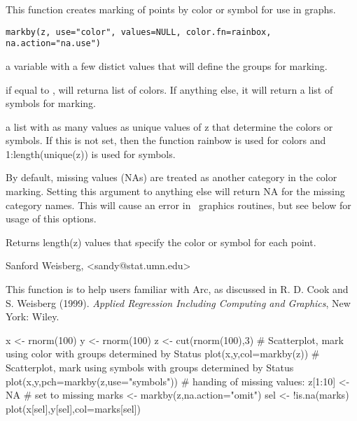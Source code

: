 \begin{Description}\relax
This function creates marking of points by color or symbol for use in graphs.\end{Description}
\begin{Usage}
\begin{verbatim}
markby(z, use="color", values=NULL, color.fn=rainbox, na.action="na.use")
\end{verbatim}
\end{Usage}
\begin{Arguments}
\begin{ldescription}
\item[\code{z}] a variable with a few distict values that will define the groups for
marking.
\item[\code{use}] if equal to , will returna list of colors.  If
anything else, it will return a list of symbols for marking.
\item[\code{values}] a list with as many values as unique values of z that determine
the colors or symbols.  If this is not set, then the function rainbow is used
for colors and 1:length(unique(z)) is used for symbols.
\item[\code{color.fn}] 
\item[\code{na.action}] 
\end{ldescription}
 By default, missing values (NAs) are treated as another
category in the color marking.  Setting this argument to anything else will
return NA for the missing category names.  This will cause an error in \R\
graphics routines, but see below for usage of this options.\end{Arguments}
\begin{Value}
Returns length(z) values that specify the color or symbol for each point.\end{Value}
\begin{Author}\relax
Sanford Weisberg, <sandy@stat.umn.edu>\end{Author}
\begin{References}\relax
This function is to help users familiar with Arc, as discussed in
R. D. Cook and S. Weisberg (1999).  \emph{Applied Regression Including
Computing and Graphics}, New York:  Wiley.\end{References}
\begin{Examples}
\begin{ExampleCode}
  x <- rnorm(100)
  y <- rnorm(100)
  z <- cut(rnorm(100),3)
# Scatterplot, mark using color with groups determined by Status
  plot(x,y,col=markby(z))
# Scatterplot, mark using symbols with groups determined by Status
  plot(x,y,pch=markby(z,use="symbols"))
# handing of missing values:
  z[1:10] <- NA   # set to missing
  marks <- markby(z,na.action="omit")
  sel <- !is.na(marks)
  plot(x[sel],y[sel],col=marks[sel])
\end{ExampleCode}
\end{Examples}

